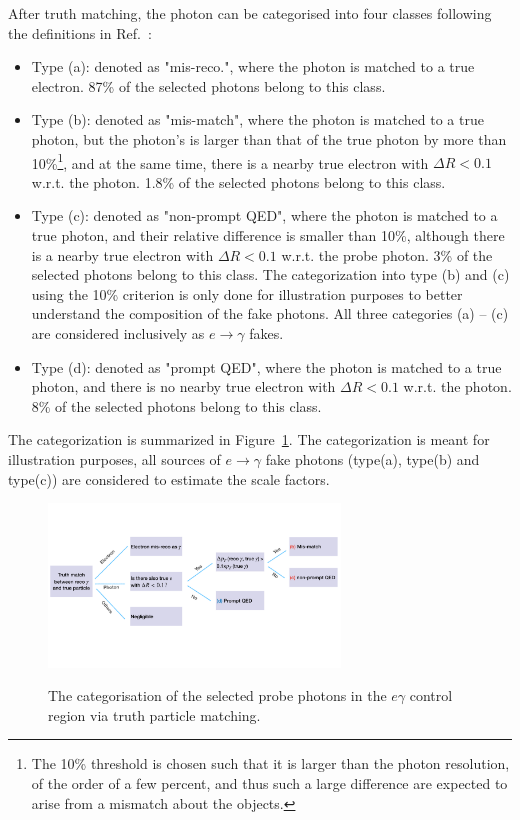After truth matching, the photon can be categorised into four classes following the definitions in Ref.~\cite{Batool:2266485}:
\begin{itemize}
\item Type (a): denoted as "mis-reco.", where the photon is matched to a true electron. 87\% of the selected photons belong to this class.
\item Type (b): denoted as "mis-match", where the photon is matched to a true photon, but the photon's \pt is larger than that of the true photon by more than 10\%\footnote{The 10\% threshold is chosen such that it is larger than the photon \pt resolution, of the order of a few percent, and thus such a large difference are expected to arise from a mismatch about the objects.}, and at the same time, there is a nearby true electron with $\Delta R < 0.1$ w.r.t. the photon. 
1.8\% of the selected photons belong to this class.
\item Type (c): denoted as "non-prompt QED", where the photon is matched to a true photon, and their relative \pt difference is smaller than 10\%, although there is a nearby true electron with $\Delta R < 0.1$ w.r.t. the probe photon. 3\% of the selected photons belong to this class. The categorization into type (b) and (c) using the 10\% criterion is only done for illustration purposes to better understand the composition of the fake photons. All three categories (a) -- (c) are considered inclusively as $e\rightarrow \gamma$ fakes. %

\item Type (d): denoted as "prompt QED", where the photon is matched to a true photon, and there is no nearby true electron with $\Delta R < 0.1$ w.r.t. the photon. 
8\% of the selected photons belong to this class. 
\end{itemize}
The categorization is summarized in Figure~\ref{fig:egammafake_classes}. The categorization is meant for illustration purposes, all sources of $e\rightarrow \gamma$ fake photons (type(a), type(b) and type(c)) are considered to estimate the scale factors. 


\begin{figure}[!htbp]
\centering
{\includegraphics[width=0.69\textwidth]{figures/egammafakes/efake_truth_matching.pdf}}
\caption [] {The categorisation of the selected probe photons in the $e\gamma$ control region via truth particle matching.}
\label{fig:egammafake_classes}
\end{figure}  

